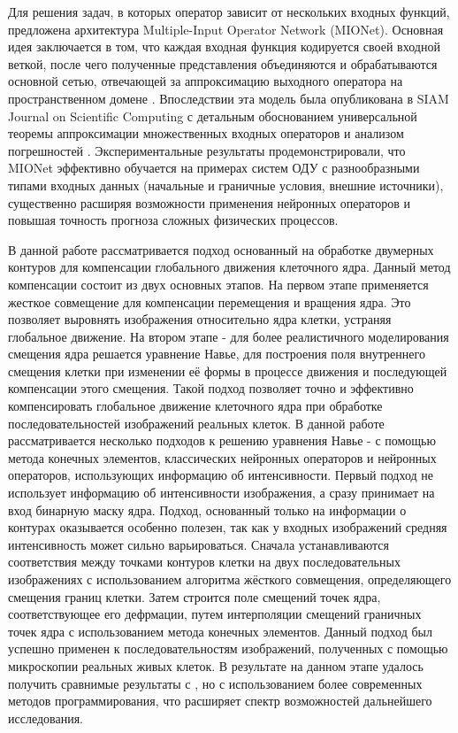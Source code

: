 \documentclass[12pt]{article}
\begin{document}
Для решения задач, в которых оператор зависит от нескольких входных функций, предложена архитектура Multiple-Input Operator Network (MIONet). Основная идея заключается в том, что каждая входная функция кодируется своей входной веткой, после чего полученные представления объединяются и обрабатываются основной сетью, отвечающей за аппроксимацию выходного оператора на пространственном домене \cite{mionet1}. Впоследствии эта модель была опубликована в SIAM Journal on Scientific Computing с детальным обоснованием универсальной теоремы аппроксимации множественных входных операторов и анализом погрешностей 
\cite{mionet1}. Экспериментальные результаты продемонстрировали, что MIONet эффективно обучается на примерах систем ОДУ с разнообразными типами входных данных (начальные и граничные условия, внешние источники), существенно расширяя возможности применения нейронных операторов и повышая точность прогноза сложных физических процессов.



В данной работе рассматривается подход основанный на обработке двумерных контуров для компенсации глобального движения клеточного ядра.
Данный метод компенсации состоит из двух основных этапов. На первом этапе применяется 
жесткое совмещение для компенсации перемещения и вращения ядра. Это позволяет выровнять 
изображения относительно ядра клетки, устраняя глобальное движение.
На втором этапе - для более реалистичного моделирования смещения ядра решается уравнение Навье, для построения поля внутреннего смещения клетки при изменении её формы в процессе движения 
и последующей компенсации этого смещения.
Такой подход позволяет точно и эффективно компенсировать глобальное движение клеточного ядра при обработке последовательностей изображений реальных клеток.
В данной работе рассматривается несколько подходов к решению уравнения Навье - с помощью метода конечных элементов, классических нейронных операторов и нейронных операторов, использующих информацию об интенсивности.
Первый подход не использует информацию об интенсивности изображения, а сразу принимает на вход бинарную маску ядра.
Подход, основанный только на информации о контурах оказывается
особенно полезен, так как у входных изображений средняя интенсивность может сильно варьироваться.
Сначала устанавливаются соответствия между точками контуров
клетки на двух последовательных изображениях с использованием
алгоритма жёсткого совмещения, определяющего смещения границ
клетки. Затем строится поле смещений точек ядра, соответствующее его дефрмации, путем интерполяции смещений граничных точек ядра
с использованием метода конечных элементов. Данный подход был успешно применен к последовательностям изображений, полученных с помощью микроскопии реальных живых клеток.
В результате на данном этапе удалось получить сравнимые результаты с \cite{sorokin2014nonrigid}, но с использованием более современных методов программирования, что 
расширяет спектр возможностей дальнейшего исследования.
\end{document}
